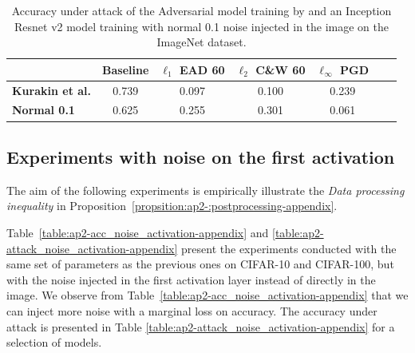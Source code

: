 \begin{table}[htb]
  \centering
  \caption{Accuracy under attack of the Adversarial model training by \citet{kurakin2016adversarial} and an Inception Resnet v2 model training with normal 0.1 noise injected in the image on the ImageNet dataset.}
  \label{table:ap2-adv_imagenet-appendix}
  \centering
  \begin{tabular}{lcccccc}
    \toprule
      & \textbf{Baseline} & \textbf{$\ell_1$ EAD 60} & \textbf{$\ell_2$ C\&W 60} & \textbf{$\ell_\infty$ PGD} \\
    \midrule
    \textbf{Kurakin et al. \cite{kurakin2016adversarial}} & 0.739 & 0.097 & 0.100 & 0.239 \\
    \textbf{Normal 0.1} & 0.625 & 0.255 & 0.301 & 0.061 \\
    \bottomrule
  \end{tabular}
\end{table}

\subsection{Experiments with noise on the first activation}

The aim of the following experiments is empirically illustrate the \textit{Data processing inequality} in Proposition~\ref{propsition:ap2-:postprocessing-appendix}. 

Table~\ref{table:ap2-acc_noise_activation-appendix} and \ref{table:ap2-attack_noise_activation-appendix} present the experiments conducted with the same set of parameters as the previous ones  on CIFAR-10 and CIFAR-100, but with the noise injected in the first activation layer instead of directly in the image. We observe from  Table~\ref{table:ap2-acc_noise_activation-appendix} that we can inject more noise with a marginal loss on accuracy. The accuracy under attack is presented in Table \ref{table:ap2-attack_noise_activation-appendix} for a selection of models. 

